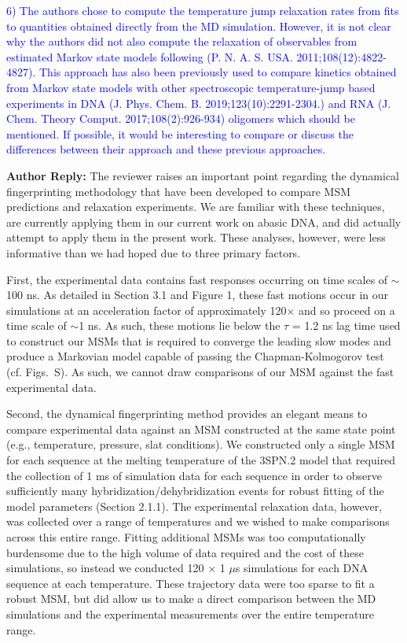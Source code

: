 \documentclass[11pt,a4paper]{letter} %
\newcommand*{\rood}[1]{{\color{red}{#1}}}
\begin{document}
\clearpage
\newpage




\textcolor{blue}{6)       The authors chose to compute the temperature jump relaxation rates from fits to quantities obtained directly from the MD simulation. However, it is not clear why the authors did not also compute the relaxation of observables from estimated Markov state models following (P. N. A. S. USA. 2011;108(12):4822-4827). This approach has also been previously used to compare kinetics obtained from Markov state models with other spectroscopic temperature-jump based experiments in DNA (J. Phys. Chem. B. 2019;123(10):2291-2304.) and RNA (J. Chem. Theory Comput. 2017;108(2):926-934) oligomers which should be mentioned. If possible, it would be interesting to compare or discuss the differences between their approach and these previous approaches.}


\textbf{Author Reply:}   The reviewer raises an important point regarding the dynamical fingerprinting methodology that have been developed to compare MSM predictions and relaxation experiments. We are familiar with these techniques, are currently applying them in our current work on abasic DNA, and did actually attempt to apply them in the present work. These analyses, however, were less informative than we had hoped due to three primary factors. 

First, the experimental data contains fast responses occurring on time scales of $\sim$100 ns. As detailed in Section 3.1 and Figure 1, these fast motions occur in our simulations at an acceleration factor of approximately 120$\times$ and so proceed on a time scale of $\sim$1 ns. As such, these motions lie below the $\tau$ = 1.2 ns lag time used to construct our MSMs that is required to converge the leading slow modes and produce a Markovian model capable of passing the Chapman-Kolmogorov test (cf. Figs.~S\rood{2-3}). As such, we cannot draw comparisons of our MSM against the fast experimental data. 

Second, the dynamical fingerprinting method provides an elegant means to compare experimental data against an MSM constructed at the same state point (e.g., temperature, pressure, slat conditions). We constructed only a single MSM for each sequence at the melting temperature of the 3SPN.2 model that required the collection of 1 ms of simulation data for each sequence in order to observe sufficiently many hybridization/dehybridization events for robust fitting of the model parameters (Section 2.1.1). The experimental relaxation data, however, was collected over a range of temperatures and we wished to make comparisons across this entire range. Fitting additional MSMs was too computationally burdensome due to the high volume of data required and the cost of these simulations, so instead we conducted 120 $\times$ 1 $\mu$s simulations for each DNA sequence at each temperature. These trajectory data were too sparse to fit a robust MSM, but did allow us to make a direct comparison between the MD simulations and the experimental measurements over the entire temperature range. 
\end{document}
